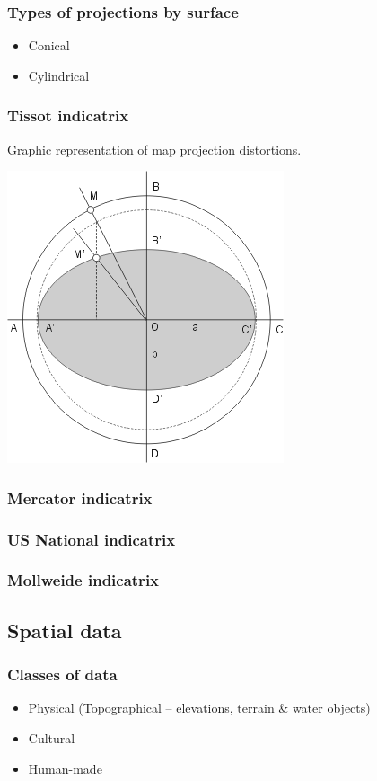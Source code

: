 \documentclass{beamer}
\begin{document}
\begin{frame}
  \frametitle{Types of projections by surface}
  \begin{itemize}
  \item Conical
  \item Cylindrical
  \end{itemize}
\end{frame}

\begin{frame}
  \frametitle{Tissot indicatrix}
  Graphic representation of map projection distortions.
  \begin{center}
    \includegraphics[scale=0.6]{pycon-2011-tutorial-files/indicatrix.png}
  \end{center}
\end{frame}

\begin{frame}
  \frametitle{Mercator indicatrix}

\end{frame}

\begin{frame}
  \frametitle{US National indicatrix}

\end{frame}

\begin{frame}
  \frametitle{Mollweide indicatrix}

\end{frame}

\subsection{Spatial data}

\begin{frame}
  \frametitle{Classes of data}
  \begin{itemize}
  \item Physical (Topographical -- elevations, terrain \& water objects)
  \item Cultural
  \item Human-made
  \end{itemize}
\end{frame}
\end{document}
